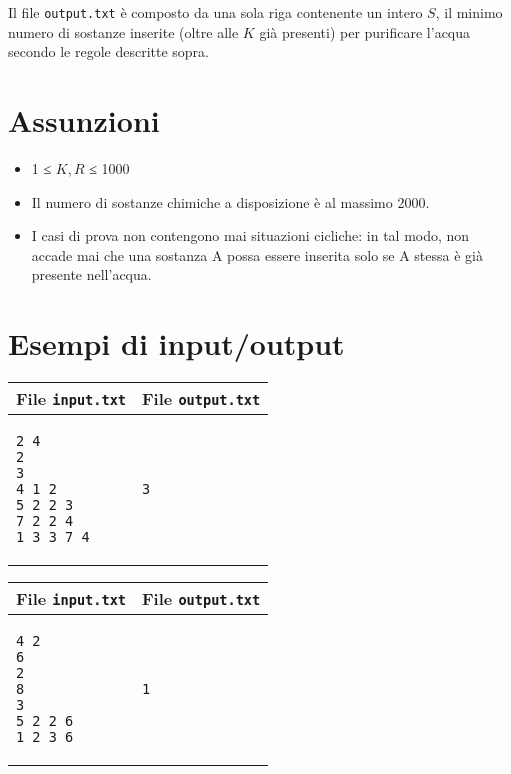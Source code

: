 \documentclass[a4paper,11pt]{article}
\begin{document}
Il file \texttt{output.txt} è composto da una sola riga
contenente un intero $S$, il minimo numero di sostanze
inserite (oltre alle $K$ già presenti) per purificare l'acqua
secondo le regole descritte sopra.

  \section*{Assunzioni}
  \begin{itemize}
  
    \item  1 ≤ $K, R$ ≤ 1000
    \item Il numero di sostanze chimiche a disposizione è al massimo 2000.
    \item I casi di prova non contengono mai situazioni cicliche: in tal
modo, non accade mai che una sostanza A possa essere inserita solo
se A stessa è già presente nell'acqua.
  \end{itemize}

\section*{Esempi di input/output}

  
    \noindent
    \begin{tabular}{p{11cm}|p{5cm}}
    \toprule
    \textbf{File \texttt{input.txt}}
    & \textbf{File \texttt{output.txt}}
    \\
    \midrule
    \scriptsize
    \begin{verbatim}
2 4
2
3
4 1 2
5 2 2 3
7 2 2 4
1 3 3 7 4
\end{verbatim}
    &
    \scriptsize
    \begin{verbatim}
3
\end{verbatim}
    \\
    \bottomrule
    \end{tabular}
  
    \noindent
    \begin{tabular}{p{11cm}|p{5cm}}
    \toprule
    \textbf{File \texttt{input.txt}}
    & \textbf{File \texttt{output.txt}}
    \\
    \midrule
    \scriptsize
    \begin{verbatim}
4 2
6
2
8
3
5 2 2 6
1 2 3 6
\end{verbatim}
    &
    \scriptsize
    \begin{verbatim}
1
\end{verbatim}
    \\
    \bottomrule
    \end{tabular}
  
\end{document}
